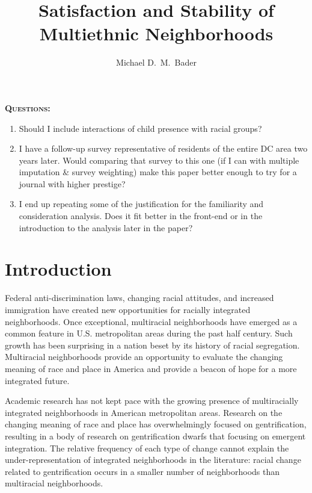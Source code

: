 \documentclass{baderart}
\title{Satisfaction and Stability of Multiethnic Neighborhoods}
\author{Michael D.\ M.\ Bader}
\begin{document}
\maketitle

\draftnote

\textbf{\textsc{Questions:}}
\begin{enumerate}
\item Should I include interactions of child presence with racial groups? 
\item I have a follow-up survey representative of residents of the entire DC area two years later. Would comparing that survey to this one (if I can with multiple imputation \& survey weighting) make this paper better enough to try for a journal with higher prestige? 
\item I end up repeating some of the justification for the familiarity and consideration analysis. Does it fit better in the front-end or in the introduction to the analysis later in the paper?
\end{enumerate}

\doublespace

\section{Introduction}\label{introduction}
Federal anti-discrimination laws, changing racial attitudes, and increased immigration have created new opportunities for racially integrated neighborhoods. Once exceptional, multiracial neighborhoods have emerged as a common feature in U.S. metropolitan areas during the past half century. Such growth has been surprising in a nation beset by its history of racial segregation. Multiracial neighborhoods provide an opportunity to evaluate the changing meaning of race and place in America and provide a beacon of hope for a more integrated future.

Academic research has not kept pace with the growing presence of multiracially integrated neighborhoods in American metropolitan areas. Research on the changing meaning of race and place has overwhelmingly focused on gentrification, resulting in a body of research on gentrification dwarfs that focusing on emergent integration. The relative frequency of each type of change cannot explain the under-representation of integrated neighborhoods in the literature: racial change related to gentrification occurs in a smaller number of neighborhoods than multiracial neighborhoods. 
\end{document}
